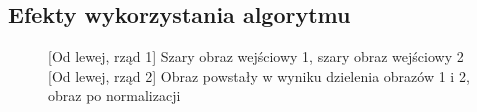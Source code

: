 \documentclass[a4paper,12pt, titlepage]{report}
\begin{document}
\subsection*{Efekty wykorzystania algorytmu}
\begin{figure}[h]
    \centering
    \qquad
    \caption{[Od lewej, rząd 1] Szary obraz wejściowy 1, szary obraz wejściowy 2 [Od lewej, rząd 2] Obraz powstały w wyniku dzielenia obrazów 1 i 2, obraz po normalizacji}%
    \label{fig:geo_after_grey1}%
\end{figure}
\end{document}

